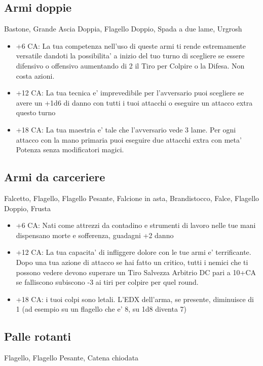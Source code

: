 \documentclass[a4paper,11pt,twoside,openany]{book}
\begin{document}
	\subsection{Armi doppie} Bastone, Grande Ascia Doppia, Flagello Doppio, Spada a due lame, Urgrosh
	
	\begin{itemize}
		\item +6 CA: La tua competenza nell'uso di queste armi ti rende estremamente versatile dandoti la possibilita' a inizio del tuo turno di scegliere se essere difensivo o offensivo aumentando di 2 il Tiro per Colpire o la Difesa. Non costa azioni.
		
		\item +12 CA: La tua tecnica e' imprevedibile per l'avversario puoi scegliere se avere un +1d6 di danno con tutti i tuoi attacchi o eseguire un attacco extra questo turno
		
		\item +18 CA: La tua maestria e' tale che l'avversario vede 3 lame. Per ogni attacco con la mano primaria puoi eseguire due attacchi extra con meta' Potenza senza modificatori magici.
	\end{itemize}
	
	\subsection{Armi da carceriere} Falcetto, Flagello, Flagello Pesante, Falcione in asta, Brandistocco, Falce, Flagello Doppio, Frusta
	
	\begin{itemize}
		\item +6 CA: Nati come attrezzi da contadino e strumenti di lavoro nelle tue mani dispensano morte e sofferenza, guadagni +2 danno
		
		\item +12 CA: La tua capacita' di infliggere dolore con le tue armi e' terrificante. Dopo una tua azione di attacco se hai fatto un critico, tutti i nemici che ti possono vedere devono superare un Tiro Salvezza Arbitrio DC pari a 10+CA se falliscono subiscono -3 ai tiri per colpire per quel round.
		
		\item +18 CA: i tuoi colpi sono letali. L'EDX dell'arma, se presente, diminuisce di 1 (ad esempio su un flagello che e' 8, su 1d8 diventa 7)
	\end{itemize}
	
	\subsection{Palle rotanti} Flagello, Flagello Pesante, Catena chiodata
	
\end{document}
